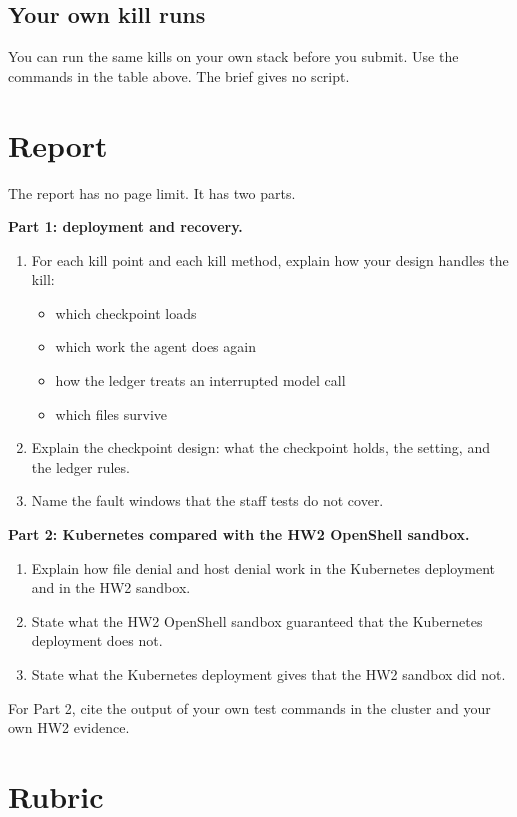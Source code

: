 \documentclass[9pt,letterpaper]{article}
\begin{document}
\subsection{Your own kill runs}\label{sec:ownkills}

You can run the same kills on your own stack before you submit. Use the commands
in the table above. The brief gives no script.

\section{Report}\label{sec:report}

The report has no page limit. It has two parts.

\textbf{Part 1: deployment and recovery.}
\begin{enumerate}
\item For each kill point and each kill method, explain how your design
  handles the kill:
  \begin{itemize}
  \item which checkpoint loads
  \item which work the agent does again
  \item how the ledger treats an interrupted model call
  \item which files survive
  \end{itemize}
\item Explain the checkpoint design: what the checkpoint holds, the
   setting, and the ledger rules.
\item Name the fault windows that the staff tests do not cover.
\end{enumerate}

\textbf{Part 2: Kubernetes compared with the HW2 OpenShell sandbox.}
\begin{enumerate}
\item Explain how file denial and host denial work in the Kubernetes deployment
  and in the HW2 sandbox.
\item State what the HW2 OpenShell sandbox guaranteed that the Kubernetes
  deployment does not.
\item State what the Kubernetes deployment gives that the HW2 sandbox did not.
\end{enumerate}
For Part 2, cite the output of your own test commands in the cluster and your
own HW2 evidence.

\section{Rubric}\label{sec:rubric}
\end{document}

